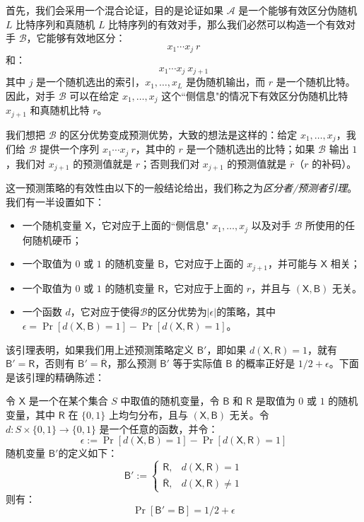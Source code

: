 首先，我们会采用一个混合论证，目的是论证如果 $\mathcal{A}$ 是一个能够有效区分伪随机 $L$ 比特序列和真随机 $L$ 比特序列的有效对手，那么我们必然可以构造一个有效对手 $\mathcal{B}$，它能够有效地区分：
$$
x_1\cdots x_j~r
$$
和：
$$
x_1\cdots x_j~x_{j+1}
$$
其中 $j$ 是一个随机选出的索引，$x_1,\dots,x_L$ 是伪随机输出，而 $r$ 是一个随机比特。因此，对手 $\mathcal{B}$ 可以在给定 $x_1,\dots,x_j$ 这个``侧信息"的情况下有效区分伪随机比特 $x_{j+1}$ 和真随机比特 $r$。

我们想把 $\mathcal{B}$ 的区分优势变成预测优势，大致的想法是这样的：给定 $x_1,\dots,x_j$，我们给 $\mathcal{B}$ 提供一个序列 $x_1\cdots x_j~r$，其中的 $r$ 是一个随机选出的比特；如果 $\mathcal{B}$ 输出 $1$，我们对 $x_{j+1}$ 的预测值就是 $r$；否则我们对 $x_{j+1}$ 的预测值就是 $\overline r$（$r$ 的补码）。

这一预测策略的有效性由以下的一般结论给出，我们称之为\emph{区分者/预测者引理}。我们有一半设置如下：
\begin{itemize}
	\item 一个随机变量 $\mathsf{X}$，它对应于上面的``侧信息" $x_1,\dots,x_j$ 以及对手 $\mathcal{B}$ 所使用的任何随机硬币；
	\item 一个取值为 $0$ 或 $1$ 的随机变量 $\mathsf{B}$，它对应于上面的 $x_{j+1}$，并可能与 $\mathsf{X}$ 相关；
	\item 一个取值为 $0$ 或 $1$ 的随机变量 $\mathsf{R}$，它对应于上面的 $r$，并且与 $(\mathsf{X},\mathsf{B})$ 无关。
	\item 一个函数 $d$，它对应于使得$\mathcal{B}$的区分优势为$|\epsilon|$的策略，其中$\epsilon=\Pr[d(\mathsf{X},\mathsf{B})=1]-\Pr[d(\mathsf{X},\mathsf{R})=1]$。
\end{itemize}
该引理表明，如果我们用上述预测策略定义 $\mathsf{B}'$，即如果 $d(\mathsf{X},\mathsf{R})=1$，就有 $\mathsf{B}'=\mathsf{R}$，否则有 $\mathsf{B}'=\mathsf{\overline R}$，那么预测 $\mathsf{B}'$ 等于实际值 $\mathsf{B}$ 的概率正好是 ${1}/{2}+\epsilon$。下面是该引理的精确陈述：

\begin{lemma}\label{lemma:3-5}
令 $\mathsf{X}$ 是一个在某个集合 $S$ 中取值的随机变量，令 $\mathsf{B}$ 和 $\mathsf{R}$ 是取值为 $0$ 或 $1$ 的随机变量，其中 $\mathsf{R}$ 在 $\{0,1\}$ 上均匀分布，且与 $(\mathsf{X},\mathsf{B})$ 无关。令 $d:S\times\{0,1\}\to\{0,1\}$ 是一个任意的函数，并令：
$$
\epsilon:=\Pr[d(\mathsf{X},\mathsf{B})=1]-\Pr[d(\mathsf{X},\mathsf{R})=1]
$$
随机变量 $\mathsf{B}'$的定义如下：
$$
\mathsf{B}':=
\left\{
\begin{array}{ll}
\mathsf{R}, & d(\mathsf{X},\mathsf{R})=1\\
\mathsf{\overline R}, & d(\mathsf{X},\mathsf{R})\neq 1
\end{array}
\right.
$$
则有：
$$
\Pr[\mathsf{B}'=\mathsf{B}]={1}/{2}+\epsilon
$$
\end{lemma}

